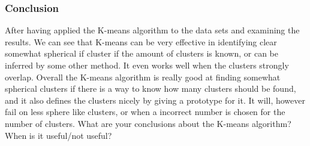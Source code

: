 \documentclass[10pt,a4paper]{article}
\begin{document}
\subsubsection{Conclusion}
After having applied the K-means algorithm to the data sets and examining the results. We can see that K-means can be very effective in identifying clear somewhat spherical if cluster if the amount of clusters is known, or can be inferred by some other method. It even works well when the clusters strongly overlap.
Overall the K-means algorithm is really good at finding somewhat spherical clusters if there is  a way to know how many clusters should be found, and it also defines the clusters nicely by giving a prototype for it. It will, however fail on less sphere like clusters, or when a incorrect number is chosen for the number of clusters.
What are your conclusions about the K-means algorithm? When is it useful/not
useful?
\end{document}
